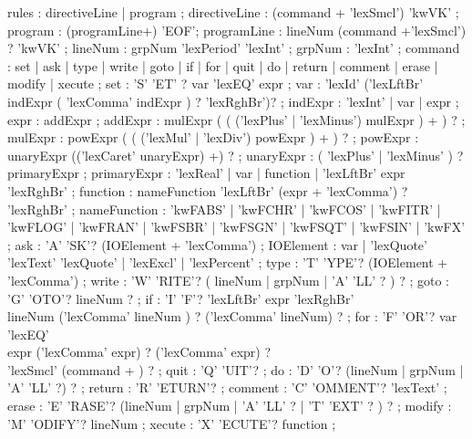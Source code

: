 \documentclass{article}
\begin{document}

\begin{rail}

rules  : directiveLine | program ;
directiveLine : (command + 'lexSmcl') 'kwVK' ;
program : (programLine+) 'EOF';
programLine : lineNum (command +'lexSmcl') ? 'kwVK' ;
lineNum : grpNum 'lexPeriod' 'lexInt' ;
grpNum : 'lexInt' ;
command : set | ask | type | write | goto | if | for | quit | do | return | comment | erase | modify | xecute ;
set : 'S' 'ET' ? var 'lexEQ' expr ;
var : 'lexId' ('lexLftBr' indExpr ( 'lexComma' indExpr ) ? 'lexRghBr')? ;
indExpr : 'lexInt' | var | expr ;
expr : addExpr ;
addExpr : mulExpr ( ( ('lexPlus' | 'lexMinus') mulExpr ) + ) ? ;
mulExpr : powExpr ( ( ('lexMul' | 'lexDiv') powExpr ) + ) ? ;
powExpr : unaryExpr  (('lexCaret' unaryExpr) +) ? ;
unaryExpr : ( 'lexPlus' | 'lexMinus' ) ? primaryExpr ;
primaryExpr : 'lexReal' | var | function | 'lexLftBr' expr 'lexRghBr' ;
function : nameFunction 'lexLftBr' (expr + 'lexComma') ? 'lexRghBr' ;
nameFunction : 'kwFABS' | 'kwFCHR' | 'kwFCOS' | 'kwFITR' | 'kwFLOG' | 'kwFRAN' | 'kwFSBR' | 'kwFSGN' | 'kwFSQT' | 'kwFSIN' | 'kwFX' ;
ask : 'A' 'SK'? (IOElement + 'lexComma') ;
IOElement : var | 'lexQuote' 'lexText' 'lexQuote' | 'lexExcl' | 'lexPercent' ;
type : 'T' 'YPE'? (IOElement + 'lexComma') ;
write : 'W' 'RITE'? ( lineNum | grpNum | 'A' 'LL' ? ) ? ;
goto :  'G' 'OTO'? lineNum ? ;
if : 'I' 'F'? 'lexLftBr' expr 'lexRghBr' \\ lineNum ('lexComma' lineNum ) ? ('lexComma' lineNum) ? ;
for : 'F' 'OR'? var 'lexEQ' \\ expr ('lexComma' expr) ? ('lexComma' expr) ? \\ 'lexSmcl' (command + ) ? ;
quit : 'Q' 'UIT'? ;
do : 'D' 'O'? (lineNum | grpNum | 'A' 'LL' ?) ? ;
return : 'R' 'ETURN'? ;
comment : 'C' 'OMMENT'? 'lexText' ;
erase : 'E' 'RASE'? (lineNum | grpNum | 'A' 'LL' ? | 'T' 'EXT' ? ) ? ;
modify : 'M' 'ODIFY'? lineNum ;
xecute : 'X' 'ECUTE'? function ;

\end{rail}
    
\end{document}
